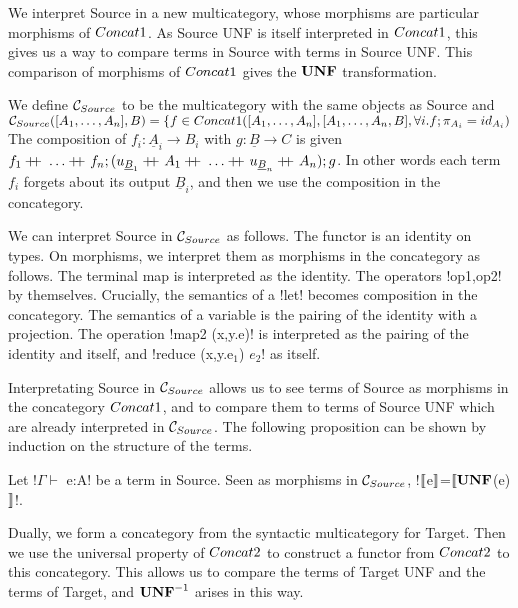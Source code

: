 We interpret Source in a new multicategory, 
whose morphisms are particular morphisms of $Concat1$.
As Source UNF is itself interpreted in $Concat1$, 
this gives us a way to compare terms in Source with terms in Source UNF.
This comparison of morphisms of $Concat1$ gives the $\mathbf{UNF}$ transformation.

\begin{definition}
    We define $\mathcal{C}_{Source}$ to be the multicategory with the same objects as Source and\\ 
    $\mathcal{C}_{Source}([A_1,\ldots,A_n],B)=\{f\in Concat1([A_1,\ldots,A_n],[A_1,\ldots,A_n,B], \forall i.f;\pi_{A_i}=id_{A_i})$\\
    The composition of $f_i:\underline{A}_i\to B_i$ with $g:\underline{B}\to C$ is given 
    $f_1\concatcomp\ldots\concatcomp f_n;(u_{\underline{B}_1}\concatcomp A_1 \concatcomp \ldots \concatcomp u_{\underline{B}_n}\concatcomp A_n);g$.
    In other words each term $f_i$ forgets about its output $\underline{B}_i$, and then we use the composition in the concategory.
\end{definition}

We can interpret Source in $\mathcal{C}_{Source}$ as follows. The functor is an identity on types. 
On morphisms, we interpret them as morphisms in the concategory as follows.
The terminal map is interpreted as the identity. The operators !op1,op2! by themselves.
Crucially, the semantics of a !let! becomes composition in the concategory. 
The semantics of a variable is the pairing of the identity with a projection.
The operation !map2 (x,y.e)! is interpreted as the pairing of the identity and itself, and !reduce (x,y.e$_1$) $e_2$! as itself.

Interpretating Source in $\mathcal{C}_{Source}$ allows us to see terms of Source as morphisms in the concategory $Concat1$, 
and to compare them to terms of Source UNF which are already interpreted in $\mathcal{C}_{Source}$.
The following proposition can be shown by induction on the structure of the terms.

\begin{proposition}
    Let !$\Gamma \vdash$ e:A! be a term in Source. 
    Seen as morphisms in $\mathcal{C}_{Source}$, !$\llbracket$e$\rrbracket$=$\llbracket\mathbf{UNF}$(e)$\rrbracket$!.
\end{proposition}

Dually, we form a concategory from the syntactic multicategory for Target.
Then we use the universal property of $Concat2$ to construct a functor from $Concat2$ to this concategory.
This allows us to compare the terms of Target UNF and the terms of Target, and $\mathbf{UNF}^{-1}$ arises in this way.

